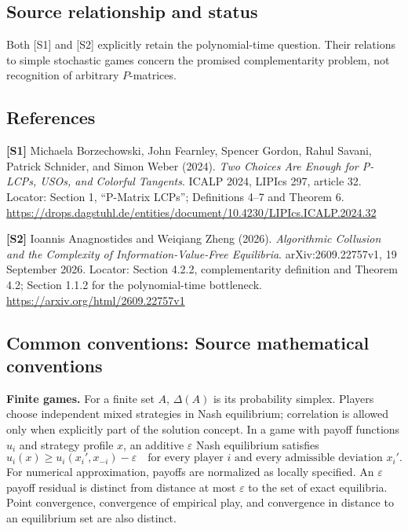 \documentclass[11pt,a4paper]{article}
\begin{document}
\subsection*{Source relationship and status}
Both [S1] and [S2] explicitly retain the polynomial-time question. Their relations to simple stochastic games concern the promised complementarity problem, not recognition of arbitrary $P$-matrices.
\subsection*{References}
\begingroup\footnotesize\raggedright
{\footnotesize\raggedright
\textbf{[S1]} Michaela Borzechowski, John Fearnley, Spencer Gordon, Rahul Savani, Patrick Schnider, and Simon Weber (2024). \emph{Two Choices Are Enough for P-LCPs, USOs, and Colorful Tangents}. ICALP 2024, LIPIcs 297, article 32. Locator: Section 1, ``P-Matrix LCPs''; Definitions 4--7 and Theorem 6. \url{https://drops.dagstuhl.de/entities/document/10.4230/LIPIcs.ICALP.2024.32}\par
\textbf{[S2]} Ioannis Anagnostides and Weiqiang Zheng (2026). \emph{Algorithmic Collusion and the Complexity of Information-Value-Free Equilibria}. arXiv:2609.22757v1, 19 September 2026. Locator: Section 4.2.2, complementarity definition and Theorem 4.2; Section 1.1.2 for the polynomial-time bottleneck. \url{https://arxiv.org/html/2609.22757v1}\par}
\par\endgroup

\subsection*{Common conventions: Source mathematical conventions}

\textbf{Finite games.} For a finite set $A$, $\Delta(A)$ is its probability
simplex. Players choose independent mixed strategies in Nash equilibrium;
correlation is allowed only when explicitly part of the solution concept.
In a game with payoff functions $u_i$ and strategy profile $x$, an additive
$\varepsilon$ Nash equilibrium satisfies
\[
 u_i(x)\geq u_i(x_i',x_{-i})-\varepsilon
 \quad\text{for every player $i$ and every admissible deviation $x_i'$}.
\]
For numerical approximation, payoffs are normalized as locally specified.
An $\varepsilon$ payoff residual is distinct from distance at most
$\varepsilon$ to the set of exact equilibria. Point convergence, convergence
of empirical play, and convergence in distance to an equilibrium set are
also distinct.
\end{document}
